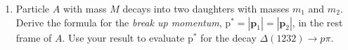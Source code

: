 
\newcommand{\ma}{\ensuremath{M}\xspace}
\newcommand{\mb}{\ensuremath{m_1}\xspace}
\newcommand{\mc}{\ensuremath{m_2}\xspace}
\newcommand{\eb}{\ensuremath{E_1}\xspace}
\newcommand{\ec}{\ensuremath{E_2}\xspace}

\newcommand{\pb}{\ensuremath{p_1}\xspace}
\newcommand{\pc}{\ensuremath{p_2}\xspace}
\newcommand{\pvecb}{\ensuremath{\textbf{p}_1}\xspace}
\newcommand{\pvecc}{\ensuremath{\textbf{p}_2}\xspace}
\newcommand{\pvecstar}{\ensuremath{\textbf{p}^{*}}\xspace}
\newcommand{\pmodvecb}{\ensuremath{\text{p}_1}\xspace}
\newcommand{\pmodvecc}{\ensuremath{\text{p}_2}\xspace}
\newcommand{\pmodvecstar}{\ensuremath{\text{p}^{*}}\xspace}

\begin{enumerate}

    \item Particle $A$ with mass \ma decays into two daughters with masses \mb
          and \mc.  Derive the formula for the {\em break up momentum},
          $\pmodvecstar = |\pvecb| = |\pvecc|$, in the rest frame of $A$.
          Use your result to evaluate $\pmodvecstar$ for the decay \mbox{$\Delta(1232)\to p\pi$}.


\end{enumerate}
